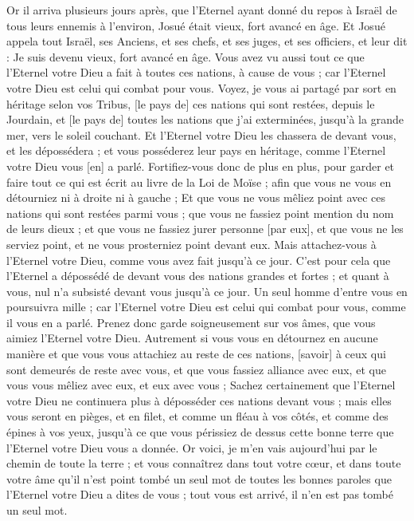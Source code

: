 \begin{multicols}{2}
\VerseOne{}Or il arriva plusieurs jours après, que l'Eternel ayant donné du repos à Israël de tous leurs ennemis à l'environ, Josué était vieux, fort avancé en âge.
Et Josué appela tout Israël, ses Anciens, et ses chefs, et ses juges, et ses officiers, et leur dit : Je suis devenu vieux, fort avancé en âge.
Vous avez vu aussi tout ce que l'Eternel votre Dieu a fait à toutes ces nations, à cause de vous ; car l'Eternel votre Dieu est celui qui combat pour vous.
Voyez, je vous ai partagé par sort en héritage selon vos Tribus, [le pays de] ces nations qui sont restées, depuis le Jourdain, et [le pays de] toutes les nations que j'ai exterminées, jusqu'à la grande mer, vers le soleil couchant.
Et l'Eternel votre Dieu les chassera de devant vous, et les dépossédera ; et vous posséderez leur pays en héritage, comme l'Eternel votre Dieu vous [en] a parlé.
Fortifiez-vous donc de plus en plus, pour garder et faire tout ce qui est écrit au livre de la Loi de Moïse ; afin que vous ne vous en détourniez ni à droite ni à gauche ;
Et que vous ne vous mêliez point avec ces nations qui sont restées parmi vous ; que vous ne fassiez point mention du nom de leurs dieux ; et que vous ne fassiez jurer personne [par eux], et que vous ne les serviez point, et ne vous prosterniez point devant eux.
Mais attachez-vous à l'Eternel votre Dieu, comme vous avez fait jusqu'à ce jour.
C'est pour cela que l'Eternel a dépossédé de devant vous des nations grandes et fortes ; et quant à vous, nul n'a subsisté devant vous jusqu'à ce jour.
Un seul homme d'entre vous en poursuivra mille ; car l'Eternel votre Dieu est celui qui combat pour vous, comme il vous en a parlé.
Prenez donc garde soigneusement sur vos âmes, que vous aimiez l'Eternel votre Dieu.
Autrement si vous vous en détournez en aucune manière et que vous vous attachiez au reste de ces nations, [savoir] à ceux qui sont demeurés de reste avec vous, et que vous fassiez alliance avec eux, et que vous vous mêliez avec eux, et eux avec vous ;
Sachez certainement que l'Eternel votre Dieu ne continuera plus à déposséder ces nations devant vous ; mais elles vous seront en pièges, et en filet, et comme un fléau à vos côtés, et comme des épines à vos yeux, jusqu'à ce que vous périssiez de dessus cette bonne terre que l'Eternel votre Dieu vous a donnée.
Or voici, je m'en vais aujourd'hui par le chemin de toute la terre ; et vous connaîtrez dans tout votre cœur, et dans toute votre âme qu'il n'est point tombé un seul mot de toutes les bonnes paroles que l'Eternel votre Dieu a dites de vous ; tout vous est arrivé, il n'en est pas tombé un seul mot.

\end{multicols}
